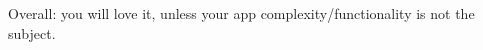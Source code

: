\documentclass[compress]{beamer}
\begin{document}
\begin{frame}
  \begin{center}
    \huge Overall: you will love it, unless your app complexity/functionality is not the subject.
  \end{center}
\end{frame}

\end{document}
